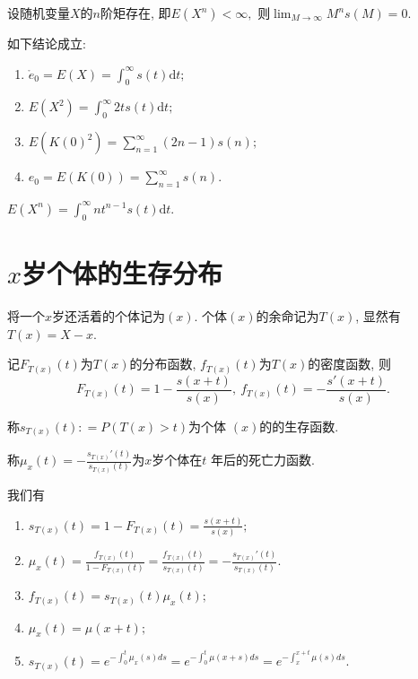 \documentclass[lang=cn,10pt]{elegantbook}
\begin{document}
\begin{lemma}\label{lemm0}
    设随机变量$X$的$n$阶矩存在, 即$E(X^n) < \infty,$ 则$\lim_{M \rightarrow \infty}M^ns(M) = 0.$
\end{lemma}

\begin{corollary}如下结论成立:
    \begin{enumerate}
        \item $\mathring{e}_0 = E(X) = \int_0^{\infty}s(t)\mathrm{d}t;$
        \item $E(X^2) = \int_{0}^{\infty} 2ts(t)\mathrm{d}t;$
        \item $E(K(0)^2) = \sum_{n = 1}^{\infty} (2n-1)s(n);$
        \item $e_0=E(K(0)) = \sum_{n = 1}^{\infty} s(n).$
    \end{enumerate}
\end{corollary}

\begin{remark}
    $E(X^n)=\int_0^\infty nt^{n-1}s(t)\mathrm{d}t$.
\end{remark}

\section{$x$岁个体的生存分布}

\begin{definition}
    将一个$x$岁还活着的个体记为$(x).$ 个体$(x)$的余命记为$T(x)$, 显然有$T(x)=X-x$.

    记$F_{T(x)}(t)$为$T(x)$的分布函数, $f_{T(x)}(t)$为$T(x)$的密度函数, 则$$F_{T(x)}(t) = 1 - \frac{s(x+t)}{s(x)}, ~f_{T(x)}(t) = -\frac{s'(x+t)}{s(x)}.$$

    称$s_{T(x)}(t): = P(T(x)>t)$为个体 $(x)$的的生存函数.
\end{definition}

\begin{definition}[$x$岁个体的死亡力]
    称$\mu_x(t) = -\frac{s_{T(x)}'(t)}{s_{T(x)}(t)}$为$x$岁个体在$t$ 年后的死亡力函数.
\end{definition}

\begin{corollary}
    我们有
    \begin{enumerate}
        \item $s_{T(x)}(t)=1-F_{T(x)}(t)=\frac{s(x+t)}{s(x)};$
        \item $\mu_{x}(t)=\frac{f_{T(x)}(t)}{1-F_{T(x)}(t)}=\frac{f_{T(x)}(t)}{s_{T(x)}(t)}=-\frac{s_{T(x)}'(t)}{s_{T(x)}(t)}.$
        \item $f_{T(x)}(t)=s_{T(x)}(t)\mu_{x}(t);$
        \item $\mu_x(t)=\mu(x+t);$
        \item $s_{T(x)}(t)=e^{-\int_0^t \mu_x(s)ds}=e^{-\int_0^t \mu(x+s)ds}=e^{-\int_x^{x+t} \mu(s)ds}.$
    \end{enumerate}
\end{corollary}
\end{document}
